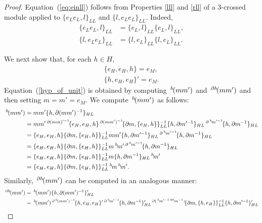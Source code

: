 \documentclass{tac}
\newcommand{\act}[1]{\,\sp{#1}\!}
\newcommand{\del}{\partial}
\begin{document}
\begin{proof}
Equation~(\ref{eq:einll}) follows from Properties \ref{lll} and \ref{rll} of a 3-crossed module applied to $\{e_L e_L, l\}_{LL}$ and $\{l, e_L e_L\}_{LL}$. Indeed,
\begin{equation}
\begin{aligned}
\{e_L e_L , l\}_{LL} &= \{e_L  , l\}_{LL}\{e_L , l\}_{LL},\\
\{l, e_L e_L \}_{LL} &= \{l, e_L\}_{LL} \{l, e_L\}_{LL}.
\end{aligned}
\label{p_einll}
\end{equation}

We next show that, for each $h\in H$,
\begin{equation}
\begin{aligned}
\{e_H, e_H, h\} = e_M,\\
\{h, e_H, e_H\}' = e_M.
\label{hyp_of_unit}
\end{aligned}
\end{equation}
Equation~(\ref{hyp_of_unit}) is obtained by computing $\act{h}(mm')$ and $\act{\del h}(mm')$ and then setting $m=m'=e_M$. We compute $\act{h}(mm')$ as follows:
\begin{align}
  \nonumber
  \act{h}(mm') &= mm'\{h,\partial (mm')^{-1}\}_{HL} \\
  \nonumber
  &= mm'\act{\partial (mm)'^{-1}}\{e_H,e_H,h\}\act{\partial (mm')^{-1}}\{\partial m,\{e_H,h\}\}_{LL}^{-1}\{h,\partial m'^{-1}\}_{HL}\act{\partial \act{h}m'^{-1}}\{h,\partial m^{-1}\}_{HL} \\
  \nonumber
  &= \{e_H,e_H,h\}\{\partial m,\{e_H,h\}\}_{LL}^{-1}mm'\{h,\partial m'^{-1}\}_{HL}\act{\partial \act{h}m'^{-1}}\{h,\partial m^{-1}\}_{HL} \\
  \label{eq:act_hmm}
  &= \{e_H,e_H,h\}\{\partial m,\{e_H,h\}\}_{LL}^{-1}m\act{h}m'\act{\partial \act{h}m'^{-1}}\{h,\partial m^{-1}\}_{HL} \\
  \nonumber
  &= \{e_H,e_H,h\}\{\partial m,\{e_H,h\}\}_{LL}^{-1}m\{h,\partial m^{-1}\}_{HL}\act{h}m' \\
  \nonumber
  &= \{e_H,e_H,h\}\{\partial m,\{e_H,h\}\}_{LL}^{-1}\act{h}m\act{h}m'.
\end{align}
Similarly, $\act{\del h}(mm')$ can be computed in an analogous manner:
\begin{align}
  \nonumber
  \act{\partial h}(mm') &= \act{h}(mm')\{h,\partial (mm')^{-1}\}_{HL} ' \\
  \nonumber
  &= \act{h}(mm')\act{\partial \act{h}(mm')^{-1}}\{h,e_H,e_H\}'\act{\partial \act{h}m'^{-1}}\{h,\partial m^{-1}\}_{HL} '\act{\partial (\act{h}m'^{-1}\act{\partial h}m^{-1})}\{\partial m,\{h,e_H\}\}_{LL} ^{-1}\{h,\partial m'^{-1}\}_{HL} ' \\

\end{align}
\end{proof}
\end{document}
